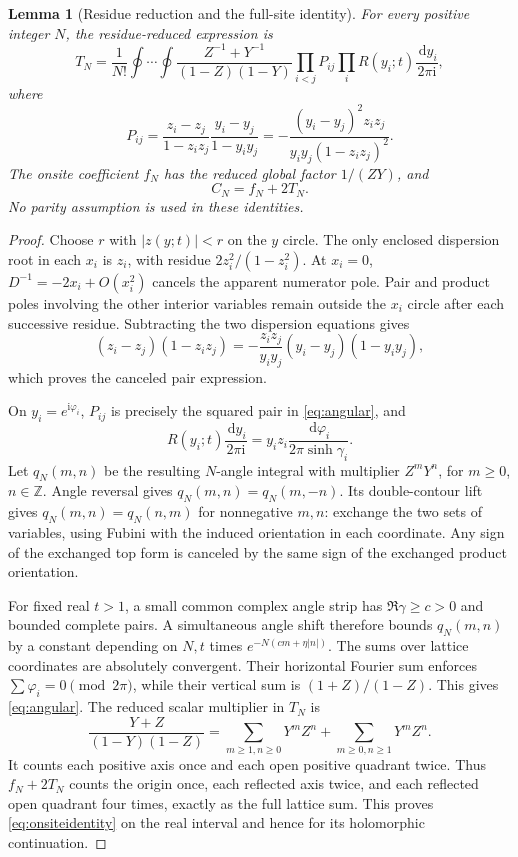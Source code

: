 \documentclass[11pt]{article}
\numberwithin{equation}{section}
\newtheorem{lemma}[theorem]{Lemma}
\theoremstyle{definition}
\newcommand{\dd}{\,\mathrm d}
\newcommand{\ii}{\mathrm i}
\newcommand{\Z}{\mathbb Z}
\begin{document}
\begin{lemma}[Residue reduction and the full-site identity]\label{lem:residue}
For every positive integer $N$, the residue-reduced expression is
\begin{equation}
 T_N=\frac1{N!}\oint\cdots\oint
 \frac{Z^{-1}+Y^{-1}}{(1-Z)(1-Y)}
 \prod_{i<j}P_{ij}\prod_i R(y_i;t)\frac{\dd y_i}{2\pi\ii},
 \label{eq:reduced}
\end{equation}
where
\begin{equation}
 P_{ij}=\frac{z_i-z_j}{1-z_iz_j}\frac{y_i-y_j}{1-y_iy_j}
 =-\frac{(y_i-y_j)^2z_iz_j}{y_iy_j(1-z_iz_j)^2}.
 \label{eq:pair}
\end{equation}
The onsite coefficient $f_N$ has the reduced global factor $1/(ZY)$,
and
\begin{equation}
 C_N=f_N+2T_N.\label{eq:onsiteidentity}
\end{equation}
No parity assumption is used in these identities.
\end{lemma}
\begin{proof}
Choose $r$ with $|z(y;t)|<r$ on the $y$ circle. The only enclosed
dispersion root in each $x_i$ is $z_i$, with residue
$2z_i^2/(1-z_i^2)$. At $x_i=0$, $D^{-1}=-2x_i+O(x_i^2)$ cancels
the apparent numerator pole. Pair and product poles involving the
other interior variables remain outside the $x_i$ circle after each
successive residue. Subtracting the two dispersion equations gives
\[
 (z_i-z_j)(1-z_iz_j)
 =-\frac{z_iz_j}{y_iy_j}(y_i-y_j)(1-y_iy_j),
\]
which proves the canceled pair expression.

On $y_i=e^{\ii\varphi_i}$, $P_{ij}$ is precisely the squared pair
in \eqref{eq:angular}, and
\[
 R(y_i;t)\frac{\dd y_i}{2\pi\ii}
 =y_i z_i\frac{\dd\varphi_i}{2\pi\sinh\gamma_i}.
\]
Let $q_N(m,n)$ be the resulting $N$-angle integral with multiplier
$Z^mY^n$, for $m\ge0$, $n\in\Z$. Angle reversal gives
$q_N(m,n)=q_N(m,-n)$. Its double-contour lift gives
$q_N(m,n)=q_N(n,m)$ for nonnegative $m,n$: exchange the two sets
of variables, using Fubini with the induced orientation in each
coordinate. Any sign of the exchanged top form is canceled by the
same sign of the exchanged product orientation.

For fixed real $t>1$, a small common complex angle strip has
$\Re\gamma\ge c>0$ and bounded complete pairs. A simultaneous
angle shift therefore bounds $q_N(m,n)$ by a constant depending on
$N,t$ times $e^{-N(c m+\eta|n|)}$. The sums over lattice
coordinates are absolutely convergent. Their horizontal Fourier
sum enforces $\sum\varphi_i=0\pmod{2\pi}$, while their vertical
sum is $(1+Z)/(1-Z)$. This gives \eqref{eq:angular}.
The reduced scalar multiplier in $T_N$ is
\[
 \frac{Y+Z}{(1-Y)(1-Z)}
 =\sum_{m\ge1,n\ge0}Y^mZ^n+
   \sum_{m\ge0,n\ge1}Y^mZ^n.
\]
It counts each positive axis once and each open positive quadrant
twice. Thus $f_N+2T_N$ counts the origin once, each reflected axis
twice, and each reflected open quadrant four times, exactly as the
full lattice sum. This proves \eqref{eq:onsiteidentity} on the
real interval and hence for its holomorphic continuation.
\end{proof}
\end{document}
